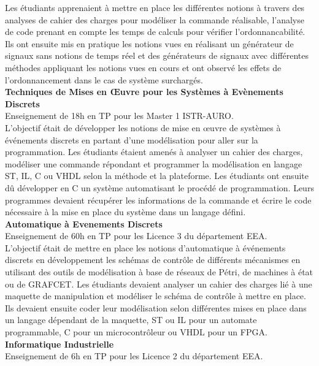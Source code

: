 \documentclass[11pt,a4paper,sans]{moderncv}         %
\begin{document}
{  Les \'etudiants apprenaient \`a mettre en place les diff\'erentes notions \`a travers des analyses de cahier des charges pour mod\'eliser la commande r\'ealisable, l'analyse de code prenant en compte les temps de calculs pour v\'erifier l'ordonnancabilit\'e.
  Ils ont ensuite mis en pratique les notions vues en r\'ealisant un g\'en\'erateur de signaux sans notions de temps r\'eel et des g\'en\'erateurs de signaux avec diff\'erentes m\'ethodes appliquant les notions vues en cours et ont observ\'e les effets de l'ordonnancement dans le cas de syst\`eme surcharg\'es.\\
  \textbf{Techniques de Mises en \OE uvre pour les Syst\`emes \`a Ev\`enements Discrets}\\
  Enseignement de 18h en TP pour les Master 1 ISTR-AURO.\\
  L'objectif \'etait de d\'evelopper les notions de mise en \oe uvre de syst\`emes \`a \'ev\'enements discrets en partant d'une mod\'elisation pour aller sur la programmation.
  Les \'etudiants \'etaient amen\'es \`a analyser un cahier des charges, mod\'eliser une commande r\'epondant et programmer la mod\'elisation en langage ST, IL, C ou VHDL selon la m\'ethode et la plateforme.
  Les \'etudiants ont ensuite d\^u d\'evelopper en C un syst\`eme automatisant le proc\'ed\'e de programmation.
  Leurs programmes devaient r\'ecup\'erer les informations de la commande et \'ecrire le code n\'ecessaire \`a la mise en place du syst\`eme dans un langage d\'efini.\\
  \textbf{Automatique \`a Evenements Discrets}\\
  Enseignement de 60h en TP pour les Licence 3 du d\'epartement EEA.\\
  L'objectif \'etait de mettre en place les notions d'automatique \`a \'ev\'enements discrets en d\'eveloppement les sch\'emas de contr\^ole de diff\'erents m\'ecanismes en utilisant des outils de mod\'elisation \`a base de r\'eseaux de P\'etri, de machines \`a \'etat ou de GRAFCET.
  Les \'etudiants devaient analyser un cahier des charges li\'e \`a une maquette de manipulation et mod\'eliser le sch\'ema de contr\^ole \`a mettre en place.
  Ils devaient ensuite coder leur mod\'elisation selon diff\'erentes mises en place dans un langage d\'ependant de la maquette, ST ou IL pour un automate programmable, C pour un microcontr\^oleur ou VHDL pour un FPGA.\\
  \textbf{Informatique Industrielle}\\
  Enseignement de 6h en TP pour les Licence 2 du d\'epartement EEA.\\
}
\end{document}
